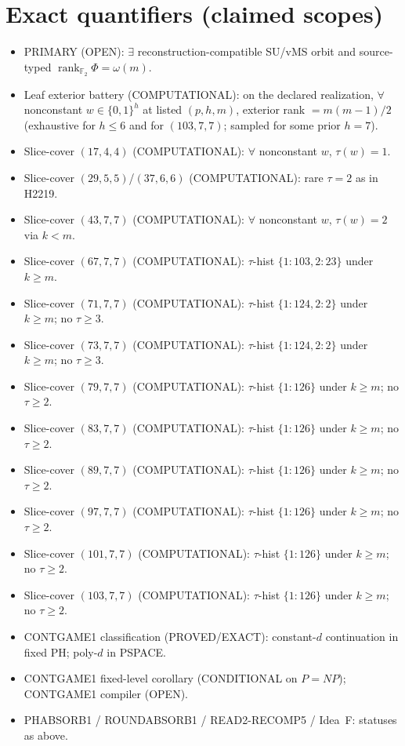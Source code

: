\documentclass[11pt]{article}
\begin{document}
\section*{Exact quantifiers (claimed scopes)}
\begin{itemize}
\item PRIMARY (OPEN): $\exists$ reconstruction-compatible SU/vMS orbit and source-typed
  $\operatorname{rank}_{\mathbb F_2}\Phi=\omega(m)$.
\item Leaf exterior battery (COMPUTATIONAL): on the declared realization, $\forall$ nonconstant
  $w\in\{0,1\}^h$ at listed $(p,h,m)$, exterior rank $=m(m-1)/2$
  (exhaustive for $h\le6$ and for $(103,7,7)$; sampled for some prior $h{=}7$).
\item Slice-cover $(17,4,4)$ (COMPUTATIONAL): $\forall$ nonconstant $w$, $\tau(w)=1$.
\item Slice-cover $(29,5,5)$/$(37,6,6)$ (COMPUTATIONAL): rare $\tau{=}2$ as in H2219.
\item Slice-cover $(43,7,7)$ (COMPUTATIONAL): $\forall$ nonconstant $w$, $\tau(w)=2$ via $k{<}m$.
\item Slice-cover $(67,7,7)$ (COMPUTATIONAL): $\tau$-hist $\{1{:}103,2{:}23\}$ under $k{\ge}m$.
\item Slice-cover $(71,7,7)$ (COMPUTATIONAL): $\tau$-hist $\{1{:}124,2{:}2\}$ under $k{\ge}m$;
  no $\tau{\ge}3$.
\item Slice-cover $(73,7,7)$ (COMPUTATIONAL): $\tau$-hist $\{1{:}124,2{:}2\}$ under $k{\ge}m$;
  no $\tau{\ge}3$.
\item Slice-cover $(79,7,7)$ (COMPUTATIONAL): $\tau$-hist $\{1{:}126\}$ under $k{\ge}m$;
  no $\tau{\ge}2$.
\item Slice-cover $(83,7,7)$ (COMPUTATIONAL): $\tau$-hist $\{1{:}126\}$ under $k{\ge}m$;
  no $\tau{\ge}2$.
\item Slice-cover $(89,7,7)$ (COMPUTATIONAL): $\tau$-hist $\{1{:}126\}$ under $k{\ge}m$;
  no $\tau{\ge}2$.
\item Slice-cover $(97,7,7)$ (COMPUTATIONAL): $\tau$-hist $\{1{:}126\}$ under $k{\ge}m$;
  no $\tau{\ge}2$.
\item Slice-cover $(101,7,7)$ (COMPUTATIONAL): $\tau$-hist $\{1{:}126\}$ under $k{\ge}m$;
  no $\tau{\ge}2$.
\item Slice-cover $(103,7,7)$ (COMPUTATIONAL): $\tau$-hist $\{1{:}126\}$ under $k{\ge}m$;
  no $\tau{\ge}2$.
\item CONTGAME1 classification (PROVED/EXACT): constant-$d$ continuation in fixed PH;
  poly-$d$ in PSPACE.
\item CONTGAME1 fixed-level corollary (CONDITIONAL on $P=NP$); CONTGAME1 compiler (OPEN).
\item PHABSORB1 / ROUNDABSORB1 / READ2-RECOMP5 / Idea~F: statuses as above.
\end{itemize}
\end{document}

